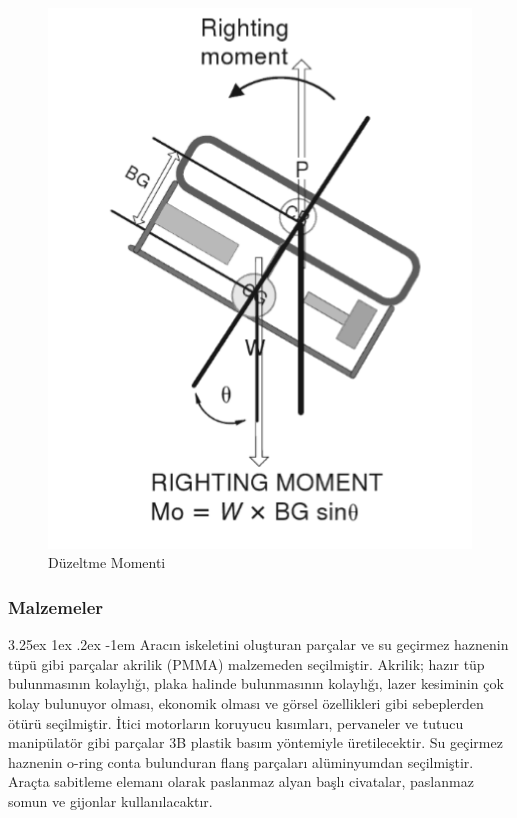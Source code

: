 \documentclass[12pt]{article}
\makeatletter
\renewcommand\paragraph{\@startsection{paragraph}{5}{\z@}%
  {3.25ex \@plus1ex \@minus.2ex}%
  {-1em}%
  {\normalfont\normalsize\bfseries}}
\makeatother
\begin{document}
\begin{figure}[h]
\centering
\includegraphics[width=1\textwidth]{images/moment.PNG}
\caption{Düzeltme Momenti}
\label{fig:moment}
\end{figure}

\subsubsection{Malzemeler}

\paragraph{} Aracın iskeletini oluşturan parçalar ve su geçirmez haznenin tüpü gibi parçalar akrilik (PMMA) malzemeden seçilmiştir. Akrilik; hazır tüp bulunmasının kolaylığı, plaka halinde bulunmasının kolaylığı, lazer kesiminin çok kolay bulunuyor olması, ekonomik olması ve görsel özellikleri gibi sebeplerden ötürü seçilmiştir. İtici motorların koruyucu kısımları, pervaneler ve tutucu manipülatör gibi parçalar 3B plastik basım yöntemiyle üretilecektir. Su geçirmez haznenin o-ring conta bulunduran flanş parçaları alüminyumdan seçilmiştir. Araçta sabitleme elemanı olarak paslanmaz alyan başlı civatalar, paslanmaz somun ve gijonlar kullanılacaktır.
\end{document}
